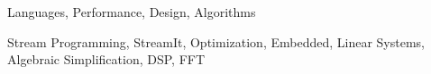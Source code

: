 \documentclass{sig-alternate}
\begin{document}
\begin{terms}
Languages, Performance, Design, Algorithms
\end{terms}

\begin{keywords}
Stream Programming, StreamIt, Optimization, Embedded, Linear Systems, Algebraic Simplification, DSP, FFT
\end{keywords}

 
\end{document}
